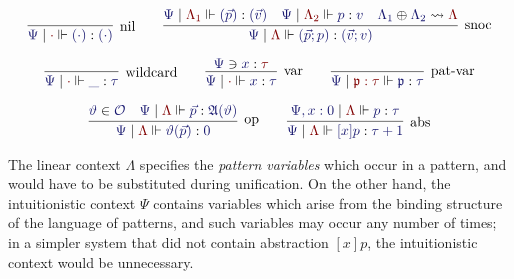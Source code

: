 \documentclass[11pt]{amsart}
\theoremstyle{definition}
\theoremstyle{remark}
\numberwithin{equation}{section}
\def\InputModeColorName{MidnightBlue}
\def\OutputModeColorName{Maroon}
\newcommand\InputMode[1]{{\color{\InputModeColorName}{#1}}}
\newcommand\OutputMode[1]{{\color{\OutputModeColorName}{#1}}}
\newcommand\Member[2]{\InputMode{#1}\in \InputMode{#2}}
\newcommand\Wild{\_}
\newcommand\CtxAppend[3]{\InputMode{#1}\oplus\InputMode{#2}\leadsto\OutputMode{#3}}
\newcommand\CtxLookup[3]{\InputMode{#1}\ni\InputMode{#2}:\OutputMode{#3}}
\newcommand\OPS{\mathcal{O}}
\newcommand\Arity{\mathfrak{A}}
\newcommand\ChkPat[4]{\InputMode{#1}\mid\OutputMode{#4}\Vdash\InputMode{#2}:\InputMode{#3}}
\newcommand\pv[1]{\mathfrak{#1}}
\newcommand\Abs[2]{[#1]#2}
\begin{document}
\begin{gather*}
  \infer[\text{nil}]{
    \ChkPat{\Psi}{(\cdot)}{(\cdot)}{\cdot}
  }{
  }
  \qquad
  \infer[\text{snoc}]{
    \ChkPat{\Psi}{(\vec{p};p)}{(\vec{v};v)}{\Lambda}
  }{
    \ChkPat{\Psi}{(\vec{p})}{(\vec{v})}{\Lambda_1} &
    \ChkPat{\Psi}{p}{v}{\Lambda_2} &
    \CtxAppend{\Lambda_1}{\Lambda_2}{\Lambda}
  }\\[6pt]
  \infer[\text{wildcard}]{
    \ChkPat{\Psi}{\Wild}{\tau}{\cdot}
  }{
  }
  \qquad
  \infer[\text{var}]{
    \ChkPat{\Psi}{x}{\tau}{\cdot}
  }{
    \CtxLookup{\Psi}{x}{\tau}
  }
  \qquad
  \infer[\text{pat-var}]{
    \ChkPat{\Psi}{\pv{p}}{\tau}{\pv{p}:\tau}
  }{
  }\\[6pt]
  \infer[\text{op}]{
    \ChkPat{\Psi}{\vartheta(\vec{p})}{0}{\Lambda}
  }{
    \Member{\vartheta}{\OPS} &
    \ChkPat{\Psi}{\vec{p}}{\Arity(\vartheta)}{\Lambda}
  }
  \qquad
  \infer[\text{abs}]{
    \ChkPat{\Psi}{\Abs{x}{p}}{\tau+1}{\Lambda}
  }{
    \ChkPat{\Psi,x:0}{p}{\tau}{\Lambda}
  }
\end{gather*}

The linear context $\Lambda$ specifies the \emph{pattern variables} which occur
in a pattern, and would have to be substituted during unification. On the other
hand, the intuitionistic context $\Psi$ contains variables which arise from the
binding structure of the language of patterns, and such variables may occur any
number of times; in a simpler system that did not contain abstraction
$\Abs{x}{p}$, the intuitionistic context would be unnecessary.
\end{document}
